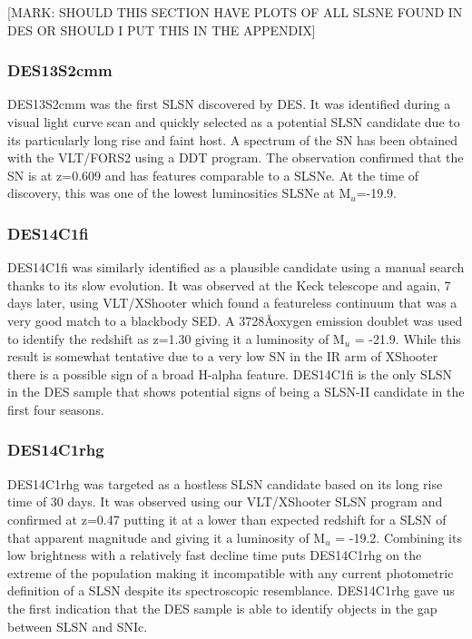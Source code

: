 [MARK: SHOULD THIS SECTION HAVE PLOTS OF ALL SLSNE FOUND IN DES OR SHOULD I PUT THIS IN THE APPENDIX]

\subsubsection{DES13S2cmm}
DES13S2cmm was the first SLSN discovered by DES. It was identified during a visual light curve scan and quickly selected as a potential SLSN candidate due to its particularly long rise and faint host. A spectrum of the SN has been obtained with the VLT/FORS2 using a DDT program. The observation confirmed that the SN is at z=0.609 and has features comparable to a SLSNe. At the time of discovery, this was one of the lowest luminosities SLSNe at M$_u$=-19.9.

\subsubsection{DES14C1fi}
DES14C1fi was similarly identified as a plausible candidate using a manual search thanks to its slow evolution. It was observed at the Keck telescope and again, 7 days later, using VLT/XShooter which found a featureless continuum that was a very good match to a blackbody SED. A 3728\AA oxygen emission doublet was used to identify the redshift as z=1.30 giving it a luminosity of M$_u$ = -21.9. While this result is somewhat tentative due to a very low S\/N in the IR arm of XShooter there is a possible sign of a broad H-alpha feature. DES14C1fi is the only SLSN in the DES sample that shows potential signs of being a SLSN-II candidate in the first four seasons.

\subsubsection{DES14C1rhg}
DES14C1rhg was targeted as a hostless SLSN candidate based on its long rise time of 30 days. It was observed using our VLT/XShooter SLSN program and confirmed at z=0.47 putting it at a lower than expected redshift for a SLSN of that apparent magnitude and giving it a luminosity of M$_u$ = -19.2. Combining its low brightness with a relatively fast decline time puts DES14C1rhg on the extreme of the population making it incompatible with any current photometric definition of a SLSN despite its spectroscopic resemblance. DES14C1rhg gave us the first indication that the DES sample is able to identify objects in the gap between SLSN and SNIc.

